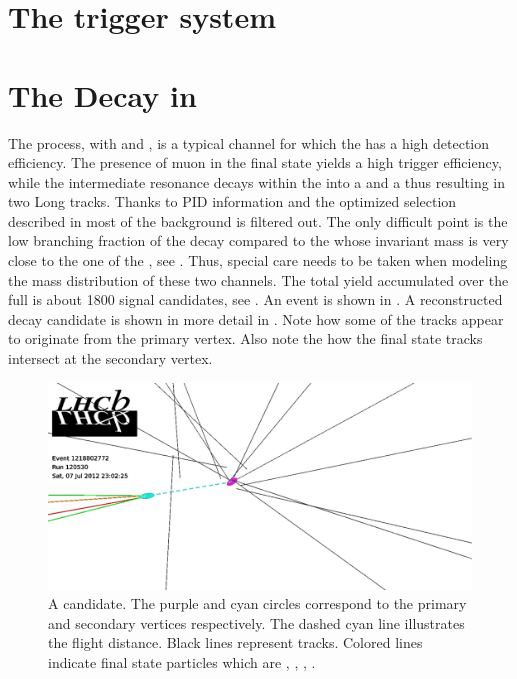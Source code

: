 \section{The trigger system}
\label{det_trigger}


\section{The \BsJpsiKst Decay in \lhcb}
\label{BspsiKst_at_lhcb}


The \BsJpsiKst process, with \Jpsimumu and \KstKpi, is a typical channel for which the \lhcb has a high detection efficiency.
The presence of muon in the final state yields a high trigger efficiency, while the intermediate
\Kstarz resonance decays within the \velo into a \Kp and a \pim thus resulting in two Long tracks.
Thanks to PID information and the optimized selection described in  most of the background
is filtered out. The only difficult point is the low branching fraction of the \BsJpsiKst decay
compared to the \BdJpsiKst whose invariant mass is very close to the one of the \BsJpsiKst, see .
Thus, special care needs to be taken when modeling the mass distribution of these two channels.
The total \BsJpsiKst yield accumulated over the full \runone is about 1800 signal candidates, see .
An \lhcb event is shown in . A reconstructed \BsJpsiKst decay candidate is shown in
more detail in . Note how some of the \velo tracks appear to originate from the
primary vertex. Also note the how the \Bs final state tracks intersect at the secondary vertex.

\begin{figure}[t]
  \centering
 \includegraphics[width=\textwidth,trim=0cm 0cm 17cm 0cm, clip=true]{Figures/Chapter2/jpsikst_event.pdf}
  \caption{A \BsJpsiKst candidate. The purple and cyan circles correspond to the primary and secondary
           vertices respectively. The dashed cyan line illustrates the \Bs flight distance.
            Black lines represent \velo tracks. Colored lines indicate final state particles which are
             {\color{green}\mmu}, {\color{green}\mmu}, {\color{red}\kaon}, {\color{orange}\pion}.}
  \label{det_jpsikst_cand}
\end{figure}


